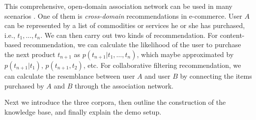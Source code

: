 This comprehensive, open-domain association network can be
used in many scenarios \cite{JiangLD12,TangWSS12}.
One of them is {\em cross-domain} recommendations in e-commerce.
User $A$ can be represented by a list of commodities or services he
or she has purchased, i.e., $t_1, \ldots, t_n$. We can then carry out two kinds
of recommendation. For content-based recommendation, we can calculate
the likelihood of the user to purchase the next product $t_{n+1}$ as
$p(t_{n+1} | t_1, \ldots, t_n)$, which maybe approximated by $p(t_{n+1} | t_1)$,
$p(t_{n+1}, t_2)$, etc.
For collaborative filtering recommendation, we can calculate the
resemblance between user $A$ and user $B$ by connecting the items purchased
by $A$ and $B$ through the association network.


Next we introduce the three corpora,
then outline the construction of the knowledge base,
and finally explain the demo setup.
